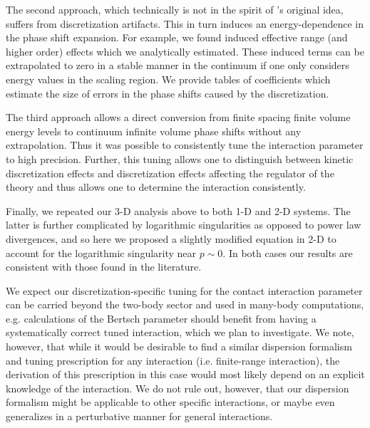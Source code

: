 The second approach, which technically is not in the spirit of \Luscher's original idea, suffers from discretization artifacts.  This in turn induces an energy-dependence in the phase shift expansion.
For example, we found induced effective range (and higher order) effects which we analytically estimated.
These induced terms can be extrapolated to zero in a stable manner in the continuum if one only considers energy values in the scaling region.
We provide tables of coefficients which estimate the size of errors in the phase shifts caused by the discretization.

The third approach allows a direct conversion from finite spacing finite volume energy levels to continuum infinite volume phase shifts without any extrapolation.
Thus it was possible to consistently tune the interaction parameter to high precision.  Further, this tuning allows one to distinguish between kinetic discretization effects and discretization effects affecting the regulator of the theory and thus allows one to determine the interaction consistently.

Finally, we repeated our 3-D analysis above to both 1-D and 2-D systems.  The latter is further complicated by logarithmic singularities as opposed to power law divergences, and so here we proposed a slightly modified \Luscher equation in 2-D to account for the logarithmic singularity near $p\sim 0$.  In both cases our results are consistent with those found in the literature.

We expect our discretization-specific tuning for the contact interaction parameter can be carried beyond the two-body sector and used in many-body computations, e.g. calculations of the Bertsch parameter should benefit from having a systematically correct tuned interaction, which we plan to investigate.
We note, however, that while it would be desirable to find a similar dispersion formalism and tuning prescription for any interaction (i.e. finite-range interaction), the derivation of this prescription in this case would most likely depend on an explicit knowledge of the interaction.
We do not rule out, however, that our dispersion formalism might be applicable to other specific interactions, or maybe even generalizes in a perturbative manner for general interactions.  %


